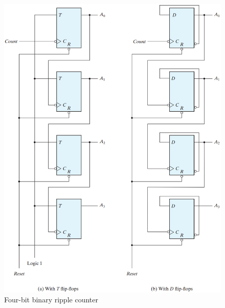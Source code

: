 \begin{figure}[H]
  \centering
  \includegraphics[width=.65\linewidth]{img/fig-6.8.png}
  \caption{Four-bit binary ripple counter}
  \label{fig:6.8}
\end{figure}

